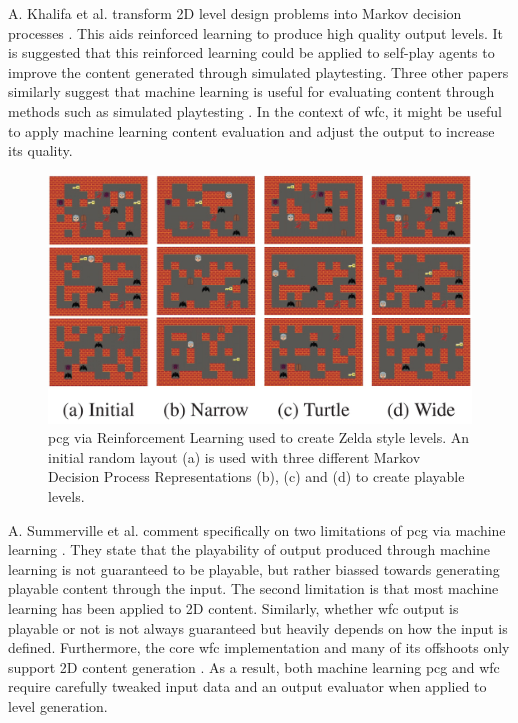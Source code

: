 A. Khalifa et al. transform 2D level design problems into Markov decision processes \cite{Markov_PCGRL}. This aids reinforced learning to produce high quality output levels. It is suggested that this reinforced learning could be applied to self-play agents to improve the content generated through simulated playtesting. Three other papers similarly suggest that machine learning is useful for evaluating content through methods such as simulated playtesting \cite{DeepLearningPCG, VGDL_ASP, PCGML}. In the context of \acrshort{wfc}, it might be useful to apply machine learning content evaluation and adjust the output to increase its quality.

\begin{figure}[H]
    \centering
    \includegraphics[width=\textwidth, height=0.3\textheight, keepaspectratio]{Images/PCGRL.jpg}
    \caption{\acrlong{pcg} via Reinforcement Learning used to create Zelda style levels. An initial random layout (a) is used with three different Markov Decision Process Representations (b), (c) and (d) to create playable levels. \cite{Markov_PCGRL}}
    \label{fig:pcgrl}
\end{figure}

A. Summerville et al. comment specifically on two limitations of \acrshort{pcg} via machine learning \cite{PCGML}. They state that the playability of output produced through machine learning is not guaranteed to be playable, but rather biassed towards generating playable content through the input. The second limitation is that most machine learning has been applied to 2D content. Similarly, whether \acrshort{wfc} output is playable or not is not always guaranteed but heavily depends on how the input is defined. Furthermore, the core \acrshort{wfc} implementation and many of its offshoots only support 2D content generation \cite{Gumin_Wave_Function_Collapse_2016}. As a result, both machine learning \acrshort{pcg} and \acrshort{wfc} require carefully tweaked input data and an output evaluator when applied to level generation.

